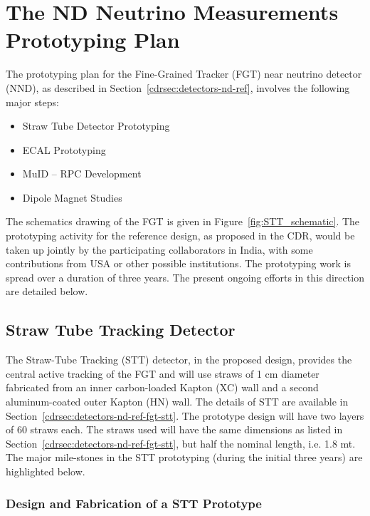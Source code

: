 
\section{The ND Neutrino Measurements Prototyping Plan} 
\label{sec:proto-nd-nnd}


The prototyping plan for the Fine-Grained Tracker (FGT) near neutrino detector (NND), as 
described in Section~\ref{cdrsec:detectors-nd-ref}, involves the following major steps:

\begin{itemize} 
\item Straw Tube Detector Prototyping
\item ECAL Prototyping
\item MuID -- RPC Development 
\item Dipole Magnet Studies
\end{itemize} 

The schematics drawing of the FGT is given in Figure~\ref{fig:STT_schematic}. The prototyping activity 
for the reference design, as proposed in the CDR, would be taken up jointly by the participating 
collaborators in India, with some contributions from USA or other possible institutions.  
The prototyping work is spread over a duration of three years. The present ongoing efforts 
in this direction are detailed below.

\subsection{Straw Tube Tracking Detector} 

The Straw-Tube Tracking (STT) detector, in the proposed design, provides the central active tracking 
of the FGT and will use straws of 1 cm diameter fabricated from an inner carbon-loaded Kapton (XC) 
wall and a second aluminum-coated outer Kapton (HN) wall. The details of STT are available in 
Section~\ref{cdrsec:detectors-nd-ref-fgt-stt}. The prototype design will have two layers of 60 straws each. 
The straws used will have the same dimensions as listed in Section~\ref{cdrsec:detectors-nd-ref-fgt-stt}, 
but half the nominal length, i.e. 1.8 mt. The major mile-stones in the STT prototyping 
(during the initial three years) are highlighted below.

\subsubsection{Design and Fabrication of a STT Prototype} 

